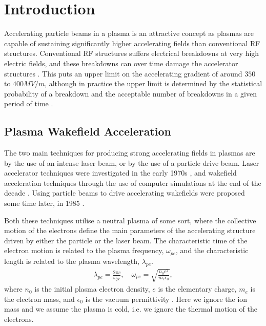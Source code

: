 %
%

\chapter{Introduction}
\label{Ch:Intro}

Accelerating particle beams in a plasma is an attractive concept as plasmas are capable of sustaining significantly higher accelerating fields than conventional RF structures. Conventional RF structures suffers electrical breakdowns at very high electric fields, and these breakdowns can over time damage the accelerator structures \cite{braun:2003}. This puts an upper limit on the accelerating gradient of around $350$ to $400\unit{MV/m}$, although in practice the upper limit is determined by the statistical probability of a breakdown and the acceptable number of breakdowns in a given period of time \cite{pritzkau:2002}.

\section{Plasma Wakefield Acceleration}
\label{Int:PWFA}

The two main techniques for producing strong accelerating fields in plasmas are by the use of an intense laser beam, or by the use of a particle drive beam. Laser accelerator techniques were investigated in the early 1970s \cite{chan:1971,palmer:1972}, and wakefield acceleration techniques through the use of computer simulations at the end of the decade \cite{tajima:1979}. Using particle beams to drive accelerating wakefields were proposed some time later, in 1985 \cite{chen:1985}.

Both these techniques utilise a neutral plasma of some sort, where the collective motion of the electrons define the main parameters of the accelerating structure driven by either the particle or the laser beam. The characteristic time of the electron motion is related to the plasma frequency, $\omega_{pe}$, and the characteristic length is related to the plasma wavelength, $\lambda_{pe}$.
\begin{align}
    \lambda_{pe} = \frac{2\pi c}{\omega_{pe}}, \quad
    \omega_{pe}  = \sqrt{\frac{n_{0}e^{2}}{m_{e}\epsilon_{0}}}, \label{EQ:PWFA:L0W0}
\end{align}
where $n_{0}$ is the initial plasma electron density, $e$ is the elementary charge, $m_{e}$ is the electron mass, and $\epsilon_{0}$ is the vacuum permittivity \cite{esarey:1996,pecseli:2012}. Here we ignore the ion mass and we assume the plasma is cold, i.e. we ignore the thermal motion of the electrons.

